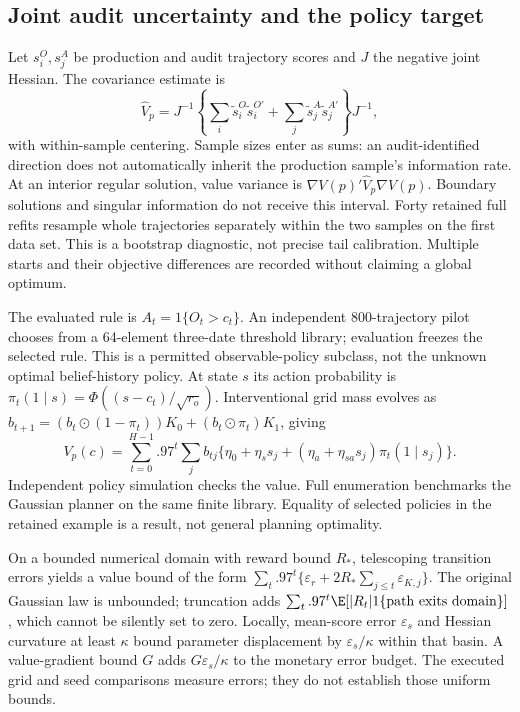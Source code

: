 \subsection{Joint audit uncertainty and the policy target}
Let $s_i^O,s_j^A$ be production and audit trajectory scores and $J$ the
negative joint Hessian. The covariance estimate is
\[
 \widehat V_p=J^{-1}\left\{
  \sum_i\widetilde s_i^O\widetilde s_i^{O\prime}+
  \sum_j\widetilde s_j^A\widetilde s_j^{A\prime}\right\}J^{-1},
\]
with within-sample centering. Sample sizes enter as sums: an audit-identified
direction does not automatically inherit the production sample's information
rate. At an interior regular solution, value variance is
$\nabla V(p)'\widehat V_p\nabla V(p)$. Boundary solutions and singular
information do not receive this interval. Forty retained full refits resample
whole trajectories separately within the two samples on the first data set.
This is a bootstrap diagnostic, not precise tail calibration. Multiple starts
and their objective differences are recorded without claiming a global optimum.

The evaluated rule is $A_t=1\{O_t>c_t\}$. An independent 800-trajectory
pilot chooses from a 64-element three-date threshold library; evaluation freezes
the selected rule. This is a permitted observable-policy subclass, not the
unknown optimal belief-history policy. At state $s$ its action probability is
$\pi_t(1\mid s)=\Phi((s-c_t)/\sqrt{r_o})$. Interventional grid mass evolves
as $b_{t+1}=(b_t\odot(1-\pi_t))K_0+(b_t\odot\pi_t)K_1$, giving
\[
 V_p(c)=\sum_{t=0}^{H-1}.97^t\sum_j b_{tj}
   \{\eta_0+\eta_s s_j+(\eta_a+\eta_{sa}s_j)\pi_t(1\mid s_j)\}.
\]
Independent policy simulation checks the value. Full enumeration benchmarks
the Gaussian planner on the same finite library. Equality of selected policies
in the retained example is a result, not general planning optimality.

On a bounded numerical domain with reward bound $R_*$, telescoping transition
errors yields a value bound of the form
$\sum_t .97^t\{\varepsilon_r+2R_*\sum_{j\le t}\varepsilon_{K,j}\}$.
The original Gaussian law is unbounded; truncation adds
$\sum_t .97^t\E[|R_t|1\{\text{path exits domain}\}]$, which cannot be
silently set to zero. Locally, mean-score error $\varepsilon_s$ and Hessian
curvature at least $\kappa$ bound parameter displacement by
$\varepsilon_s/\kappa$ within that basin. A value-gradient bound $G$ adds
$G\varepsilon_s/\kappa$ to the monetary error budget. The executed grid and
seed comparisons measure errors; they do not establish those uniform bounds.

